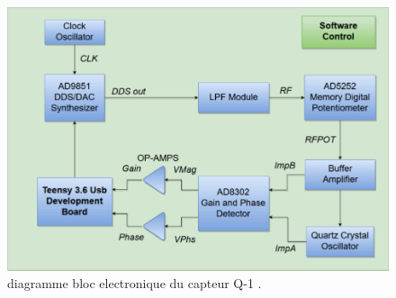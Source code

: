 \begin{figure}[H]
    \centering
    \includegraphics[width=\textwidth]{assets/figures/electronic block diagram QCM.png}
    \caption{diagramme bloc electronique du capteur Q-1 \cite{manual-openqcmQ1}.}
    \label{fig:bloc diagram Q-1}
\end{figure}

